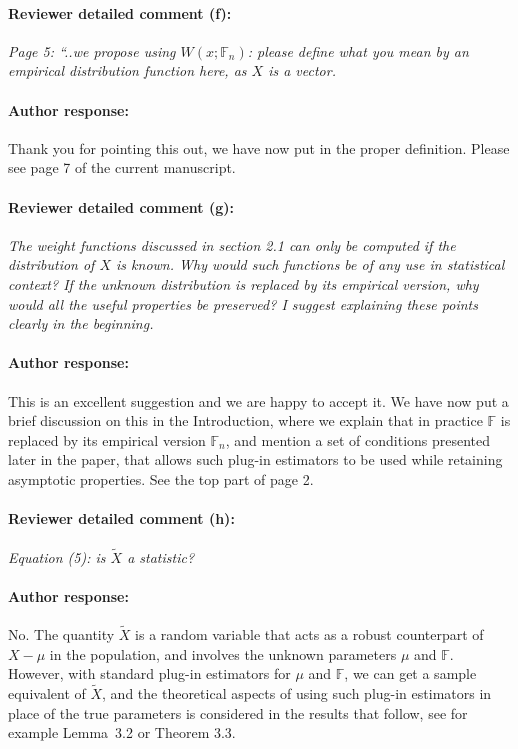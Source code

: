 \documentclass[11pt,letterpaper]{article}
\newcommand{\BF}{{\mathbb{F}}}
\theoremstyle{definition} \newtheorem{Definition}[Theorem]{Definition}
\begin{document}
\paragraph{Reviewer detailed comment (f):}
\textit{Page 5: “..we propose using $W(x; \BF_n)$: please define what you mean by an empirical distribution function here, as $X$ is a vector.
}

\paragraph{Author response:}
Thank you for pointing this out, we have now put in the proper definition. Please see 
page 7 of the current manuscript.

\paragraph{Reviewer detailed comment (g):}
\textit{The weight functions discussed in section 2.1 can only be computed if the distribution of $X$ is known. Why would such functions be of any use in statistical context? If the unknown distribution is replaced by its empirical version, why would all the useful properties be
preserved? I suggest explaining these points clearly in the beginning.
}

\paragraph{Author response:}
This is an excellent suggestion and we are happy to accept it.
We have now put a brief discussion on this in the Introduction, where we explain that 
in practice $\BF$ is replaced by its empirical version $\BF_{n}$, and mention a set of 
conditions presented later in the paper, that allows such plug-in estimators to be used 
while retaining asymptotic properties. See the top part of page 2. 


\paragraph{Reviewer detailed comment (h):}
\textit{
Equation (5): is $\tilde X$ a statistic?
}

\paragraph{Author response:}
No. The quantity $\tilde X$ is a random variable that acts as a robust counterpart of 
$X - \mu$ in the population, and involves the unknown parameters $\mu$ and $\BF$. 
However, with standard plug-in estimators for $\mu$ and $\BF$, we can get a 
sample equivalent of $\tilde{X}$, and the theoretical aspects of using  such plug-in 
estimators in place of the true parameters is considered in the results that follow, see 
for example Lemma~3.2 or Theorem 3.3.  
\end{document}
